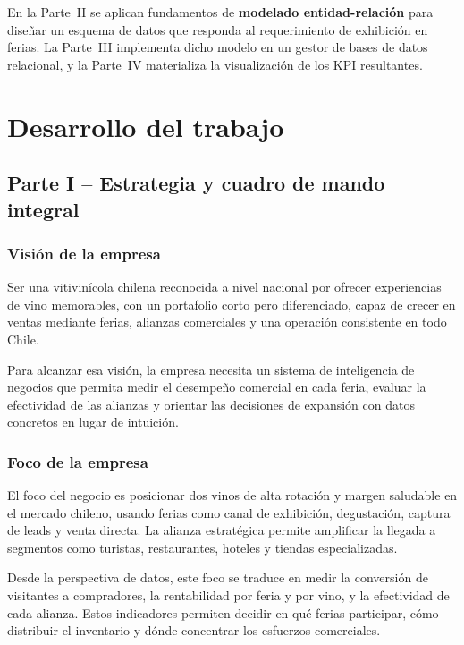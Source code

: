 \documentclass[10pt,a4paper]{article}
\begin{document}
En la Parte~II se aplican fundamentos de \textbf{modelado entidad-relaci\'on} para dise\~nar un esquema de datos que responda al requerimiento de exhibici\'on en ferias. La Parte~III implementa dicho modelo en un gestor de bases de datos relacional, y la Parte~IV materializa la visualizaci\'on de los KPI resultantes.

\section{Desarrollo del trabajo}

\subsection{Parte I -- Estrategia y cuadro de mando integral}

\subsubsection{Visi\'on de la empresa}

Ser una vitivin\'icola chilena reconocida a nivel nacional por ofrecer experiencias de vino memorables, con un portafolio corto pero diferenciado, capaz de crecer en ventas mediante ferias, alianzas comerciales y una operaci\'on consistente en todo Chile.

Para alcanzar esa visi\'on, la empresa necesita un sistema de inteligencia de negocios que permita medir el desempe\~no comercial en cada feria, evaluar la efectividad de las alianzas y orientar las decisiones de expansi\'on con datos concretos en lugar de intuici\'on.

\subsubsection{Foco de la empresa}

El foco del negocio es posicionar dos vinos de alta rotaci\'on y margen saludable en el mercado chileno, usando ferias como canal de exhibici\'on, degustaci\'on, captura de leads y venta directa. La alianza estrat\'egica permite amplificar la llegada a segmentos como turistas, restaurantes, hoteles y tiendas especializadas.

Desde la perspectiva de datos, este foco se traduce en medir la conversi\'on de visitantes a compradores, la rentabilidad por feria y por vino, y la efectividad de cada alianza. Estos indicadores permiten decidir en qu\'e ferias participar, c\'omo distribuir el inventario y d\'onde concentrar los esfuerzos comerciales.
\end{document}
